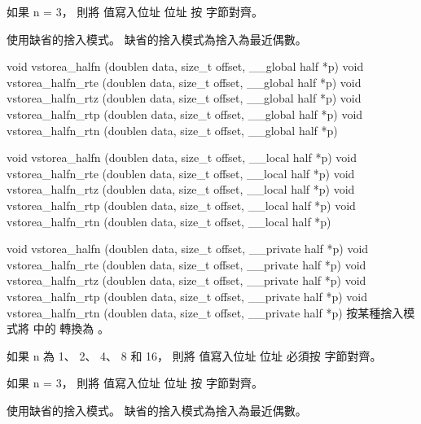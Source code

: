 如果 n = 3，
則將  值寫入位址 
位址  按
  字節對齊。

 使用缺省的捨入模式。
缺省的捨入模式為捨入為最近偶數。
\stopbuffer

void vstorea_halfn (doublen data,
	size_t offset,
	__global half *p)
void vstorea_halfn_rte (doublen data,
	size_t offset,
	__global half *p)
void vstorea_halfn_rtz (doublen data,
	size_t offset,
	__global half *p)
void vstorea_halfn_rtp (doublen data,
	size_t offset,
	__global half *p)
void vstorea_halfn_rtn (doublen data,
	size_t offset,
	__global half *p)

void vstorea_halfn (doublen data,
	size_t offset,
	__local half *p)
void vstorea_halfn_rte (doublen data,
	size_t offset,
	__local half *p)
void vstorea_halfn_rtz (doublen data,
	size_t offset,
	__local half *p)
void vstorea_halfn_rtp (doublen data,
	size_t offset,
	__local half *p)
void vstorea_halfn_rtn (doublen data,
	size_t offset,
	__local half *p)

void vstorea_halfn (doublen data,
	size_t offset,
	__private half *p)
void vstorea_halfn_rte (doublen data,
	size_t offset,
	__private half *p)
void vstorea_halfn_rtz (doublen data,
	size_t offset,
	__private half *p)
void vstorea_halfn_rtp (doublen data,
	size_t offset,
	__private half *p)
void vstorea_halfn_rtn (doublen data,
	size_t offset,
	__private half *p)
\stopbuffer
{}
按某種捨入模式將  中的  轉換為 。

如果 n 為 1、 2、 4、 8 和 16，
則將  值寫入位址 
位址  必須按
  字節對齊。

如果 n = 3，
則將  值寫入位址 
位址  按
  字節對齊。

 使用缺省的捨入模式。
缺省的捨入模式為捨入為最近偶數。
\stopbuffer


\startCLFD
{}
\stopCLFD


